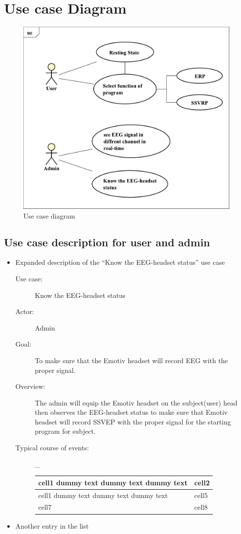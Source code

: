 \section{Use case Diagram}
\begin{figure}[ht]
	\centering
	\includegraphics[scale = 0.5]{chapter4/uc.pdf}
	\caption{Use case diagram}
\end{figure}

\newpage

\subsection{Use case description for user and admin}
\begin{itemize}
	\item Expanded description of the “Know the EEG-headset status” use case
	\begin{description}
		\item [Use case:]Know the EEG-headset status 
		\item [Actor:]Admin 
		\item [Goal:]To make sure that the Emotiv headset will record EEG with the proper signal. 
		\item[Overview:]The admin will equip the Emotiv headset on the subject(user) head then observes the EEG-headset status to make sure that Emotiv headset will record SSVEP with the proper signal for the starting program for subject.	
		\item[Typical course of events:] _
		{
			\begin{tabular}{ | m{7cm}| m{7cm} | } 
				\hline
				cell1 dummy text dummy text dummy text& cell2  \\ 
				\hline
				cell1 dummy text dummy text dummy text & cell5  \\ 
				\hline
				cell7 & cell8  \\ 
				\hline
			\end{tabular}
	}
		
	\end{description}
	\item Another entry in the list
\end{itemize}


